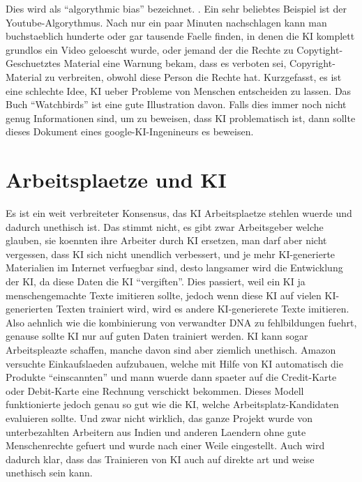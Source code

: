 \documentclass{report}
\begin{document}
Dies wird als \enquote{algorythmic bias} bezeichnet. \citep{algorythmic-bias}.
\newline 
Ein sehr beliebtes Beispiel ist der Youtube-Algorythmus. Nach nur ein paar Minuten nachschlagen kann man buchstaeblich hunderte oder gar tausende Faelle finden, in denen die KI komplett grundlos ein Video geloescht wurde, oder jemand der die Rechte zu Copytight-Geschuetztes Material eine Warnung bekam, dass es verboten sei, Copyright-Material zu verbreiten, obwohl diese Person die Rechte hat.
\newline
Kurzgefasst, es ist eine schlechte Idee, KI ueber Probleme von Menschen entscheiden zu lassen. Das Buch \enquote{Watchbirds} ist eine gute Illustration davon. Falls dies immer noch nicht genug Informationen sind, um zu beweisen, dass KI problematisch ist, dann sollte dieses
Dokument \citep{google-enginner-says-big-ai-sucks}
eines google-KI-Ingenineurs es beweisen.
\section{Arbeitsplaetze und KI}
Es ist ein weit verbreiteter Konsensus, das KI Arbeitsplaetze stehlen wuerde und dadurch unethisch ist. Das stimmt nicht, es gibt zwar Arbeitsgeber welche glauben, sie koennten ihre Arbeiter durch KI ersetzen, man darf aber nicht vergessen, dass KI sich nicht unendlich verbessert, und je mehr KI-generierte Materialien im Internet verfuegbar sind, desto langsamer wird die Entwicklung der KI, da diese Daten die KI \enquote{vergiften}. Dies passiert, weil ein KI ja menschengemachte Texte imitieren sollte, jedoch wenn diese KI auf vielen KI-generierten Texten trainiert wird, wird es andere KI-generierete Texte imitieren. Also aehnlich wie die kombinierung von verwandter DNA zu fehlbildungen fuehrt, genause sollte KI nur auf guten Daten trainiert werden.
\newline
\newline
KI kann sogar Arbeitspleazte schaffen, manche davon sind aber ziemlich unethisch. Amazon versuchte Einkaufslaeden aufzubauen, welche mit Hilfe von KI automatisch die Produkte \enquote{einscannten} und mann wuerde dann spaeter auf die Credit-Karte oder Debit-Karte eine Rechnung verschickt bekommen.
\newline
Dieses Modell funktionierte jedoch genau so gut wie die KI, welche Arbeitsplatz-Kandidaten evaluieren sollte. Und zwar nicht wirklich, das ganze Projekt wurde von unterbezahlten Arbeitern aus Indien und anderen Laendern ohne gute Menschenrechte gefuert und wurde nach einer Weile eingestellt. Auch wird dadurch klar, dass das Trainieren von KI auch auf direkte art und weise unethisch sein kann.
\end{document}
